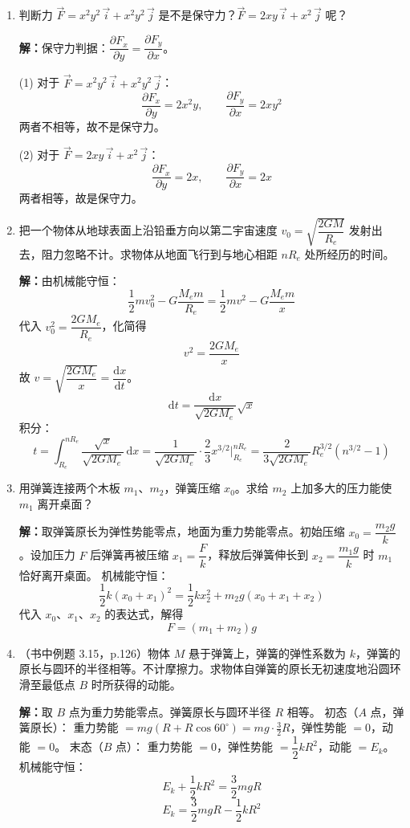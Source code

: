 \documentclass{ctexart}
\begin{document}
\begin{enumerate}
\item 判断力 $\vec{F} = x^{2}y^{2}\,\vec{i} + x^{2}y^{2}\,\vec{j}$ 是不是保守力？$\vec{F} = 2xy\,\vec{i} + x^{2}\,\vec{j}$ 呢？

\textbf{解：}保守力判据：$\dfrac{\partial F_x}{\partial y} = \dfrac{\partial F_y}{\partial x}$。

(1) 对于 $\vec{F} = x^{2}y^{2}\,\vec{i} + x^{2}y^{2}\,\vec{j}$：
\[
\frac{\partial F_x}{\partial y} = 2x^{2}y,\qquad
\frac{\partial F_y}{\partial x} = 2xy^{2}
\]
两者不相等，故不是保守力。

(2) 对于 $\vec{F} = 2xy\,\vec{i} + x^{2}\,\vec{j}$：
\[
\frac{\partial F_x}{\partial y} = 2x,\qquad
\frac{\partial F_y}{\partial x} = 2x
\]
两者相等，故是保守力。

\item 把一个物体从地球表面上沿铅垂方向以第二宇宙速度 $v_0 = \sqrt{\dfrac{2GM}{R_e}}$ 发射出去，阻力忽略不计。求物体从地面飞行到与地心相距 $nR_e$ 处所经历的时间。

\textbf{解：}由机械能守恒：
\[
\frac12 mv_0^{2} - G\frac{M_e m}{R_e} = \frac12 mv^{2} - G\frac{M_e m}{x}
\]
代入 $v_0^{2} = \dfrac{2GM_e}{R_e}$，化简得
\[
v^{2} = \frac{2GM_e}{x}
\]
故 $v = \sqrt{\dfrac{2GM_e}{x}} = \dfrac{\mathrm{d}x}{\mathrm{d}t}$。
\[
\mathrm{d}t = \frac{\mathrm{d}x}{\sqrt{2GM_e}}\sqrt{x}
\]
积分：
\[
t = \int_{R_e}^{nR_e} \frac{\sqrt{x}}{\sqrt{2GM_e}}\,\mathrm{d}x
= \frac{1}{\sqrt{2GM_e}}\cdot\frac23 x^{3/2}\Big|_{R_e}^{nR_e}
= \frac{2}{3\sqrt{2GM_e}} R_e^{3/2}(n^{3/2} - 1)
\]

\item 用弹簧连接两个木板 $m_1$、$m_2$，弹簧压缩 $x_0$。求给 $m_2$ 上加多大的压力能使 $m_1$ 离开桌面？

\textbf{解：}取弹簧原长为弹性势能零点，地面为重力势能零点。初始压缩 $x_0 = \dfrac{m_2 g}{k}$。设加压力 $F$ 后弹簧再被压缩 $x_1 = \dfrac{F}{k}$，释放后弹簧伸长到 $x_2 = \dfrac{m_1 g}{k}$ 时 $m_1$ 恰好离开桌面。
机械能守恒：
\[
\frac12 k(x_0 + x_1)^{2} = \frac12 k x_2^{2} + m_2 g(x_0 + x_1 + x_2)
\]
代入 $x_0$、$x_1$、$x_2$ 的表达式，解得
\[
F = (m_1 + m_2)g
\]

\item（书中例题 3.15，p.126）物体 $M$ 悬于弹簧上，弹簧的弹性系数为 $k$，弹簧的原长与圆环的半径相等。不计摩擦力。求物体自弹簧的原长无初速度地沿圆环滑至最低点 $B$ 时所获得的动能。

\textbf{解：}取 $B$ 点为重力势能零点。弹簧原长与圆环半径 $R$ 相等。
初态（$A$ 点，弹簧原长）：
重力势能 $= mg(R + R\cos 60^{\circ}) = mg\cdot\frac32 R$，弹性势能 $= 0$，动能 $= 0$。
末态（$B$ 点）：
重力势能 $= 0$，弹性势能 $= \dfrac12 kR^{2}$，动能 $= E_k$。
机械能守恒：
\[
E_k + \frac12 kR^{2} = \frac32 mgR
\]
\[
E_k = \frac32 mgR - \frac12 kR^{2}
\]

\end{enumerate}
\end{document}
